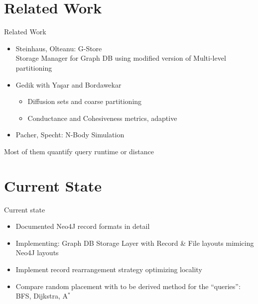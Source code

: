 \documentclass[rgb]{beamer}
\begin{document}
\section{Related Work}
    \begin{frame}[allowframebreaks]{Related Work}
        \begin{itemize}
            \item Steinhaus, Olteanu: G-Store~\autocite{steinhaus} \\
                Storage Manager for Graph DB using modified version of Multi-level partitioning~\autocite{karypis} \vspace{0.5cm} \\
            \item Gedik with Ya\c{s}ar and Bordawekar \vspace{0.3cm} \\
                \begin{itemize}
                    \item Diffusion sets and coarse partitioning~\autocite{yacsar,yacsar1}
                    \item Conductance and Cohesiveness metrics, adaptive~\autocite{gedik} \vspace{0.5cm} \\
                \end{itemize}
            \item Pacher, Specht: N-Body Simulation \vspace{0.8cm} \\
        \end{itemize}
        Most of them quantify query runtime or distance \\
    \end{frame}

\section{Current State}
    \begin{frame}{Current state}
        \begin{itemize}
            \item Documented Neo4J record formats in detail \vspace{0.5cm} \\
            \item Implementing: Graph DB Storage Layer with Record \& File layouts mimicing Neo4J layouts \vspace{0.5cm} \\

            \item Implement record rearrangement strategy optimizing locality \vspace{0.5cm} \\

            \item Compare random placement with to be derived method for the ``queries'': BFS, Dijkstra, A$^*$ \vspace{0.5cm} \\
        \end{itemize}
    \end{frame}
\end{document}
